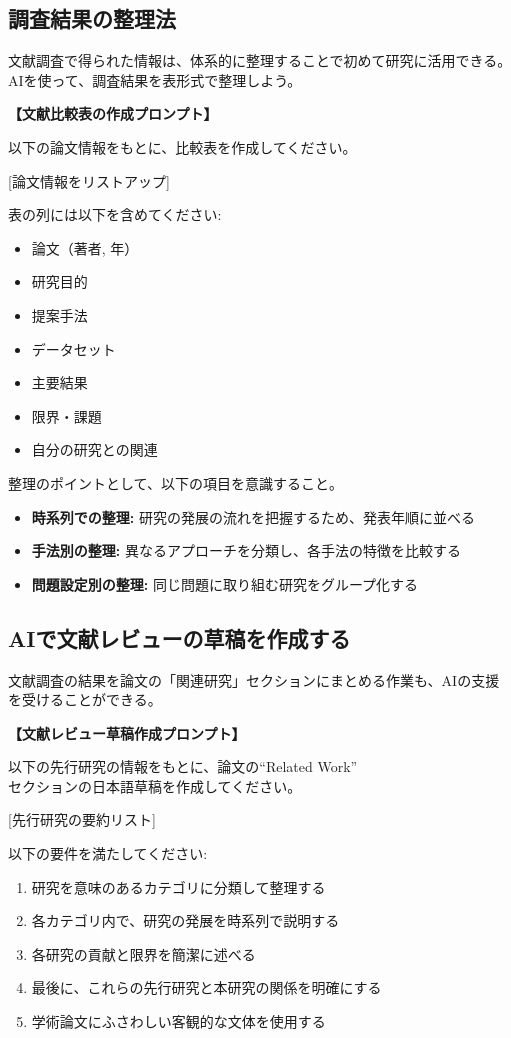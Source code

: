 \subsection{調査結果の整理法}

文献調査で得られた情報は、体系的に整理することで初めて研究に活用できる。AIを使って、調査結果を表形式で整理しよう。

\begin{promptbox}
\textbf{【文献比較表の作成プロンプト】}

以下の論文情報をもとに、比較表を作成してください。

{[}論文情報をリストアップ]

表の列には以下を含めてください:
\begin{itemize}
\item 論文（著者, 年）
\item 研究目的
\item 提案手法
\item データセット
\item 主要結果
\item 限界・課題
\item 自分の研究との関連
\end{itemize}
\end{promptbox}

整理のポイントとして、以下の項目を意識すること。

\begin{itemize}
\item \textbf{時系列での整理:} 研究の発展の流れを把握するため、発表年順に並べる
\item \textbf{手法別の整理:} 異なるアプローチを分類し、各手法の特徴を比較する
\item \textbf{問題設定別の整理:} 同じ問題に取り組む研究をグループ化する
\end{itemize}

\subsection{AIで文献レビューの草稿を作成する}

文献調査の結果を論文の「関連研究」セクションにまとめる作業も、AIの支援を受けることができる。

\begin{promptbox}
\textbf{【文献レビュー草稿作成プロンプト】}

以下の先行研究の情報をもとに、論文の``Related Work''\\
セクションの日本語草稿を作成してください。

{[}先行研究の要約リスト]

以下の要件を満たしてください:
\begin{enumerate}
\item 研究を意味のあるカテゴリに分類して整理する
\item 各カテゴリ内で、研究の発展を時系列で説明する
\item 各研究の貢献と限界を簡潔に述べる
\item 最後に、これらの先行研究と本研究の関係を明確にする
\item 学術論文にふさわしい客観的な文体を使用する
\end{enumerate}
\end{promptbox}

